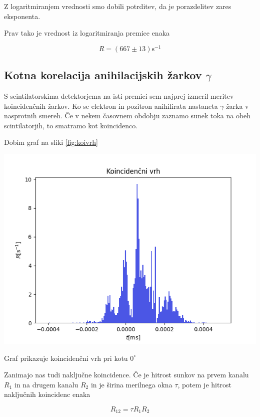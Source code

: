 \documentclass[11pt]{article}
\begin{document}
Z logaritmiranjem vrednosti smo dobili potrditev, da je porazdelitev zares eksponenta.

Prav tako je vrednost iz logaritmiranja premice enaka

\[ R = (667 \pm 13) \mathrm{s}^{-1}
\]

\subsection{Kotna korelacija anihilacijskih žarkov $\gamma$}\label{sec:orgbb3588f}

S scintilatorskima detektorjema na isti premici sem najprej izmeril meritev koincidenčnih žarkov. Ko se elektron in pozitron anihilirata nastaneta \(\gamma\) žarka v nasprotnih smereh. Če v nekem časovnem obdobju zaznamo sunek toka na obeh scintilatorjih, to smatramo kot koincidenco.

Dobim graf na sliki \ref{fig:koivrh}

\begin{slika}[H]
  \centering
  \includegraphics[width=.9\linewidth]{figures/koincidencni_vrh.png}
  \caption{\small Graf prikazuje koincidenčni vrh pri kotu $0^{\circ}$}\label{fig:koivrh}
\end{slika}

Zanimajo nas tudi naključne koincidence. Če je hitrost sunkov na prvem kanalu \(R_1\) in na drugem kanalu \(R_2\) in je širina merilnega okna \(\tau\), potem je hitrost naključnih koincidenc enaka

\begin{equation}
\label{eq:3}
R_{12} = \tau R_1 R_2
\end{equation}
\end{document}
